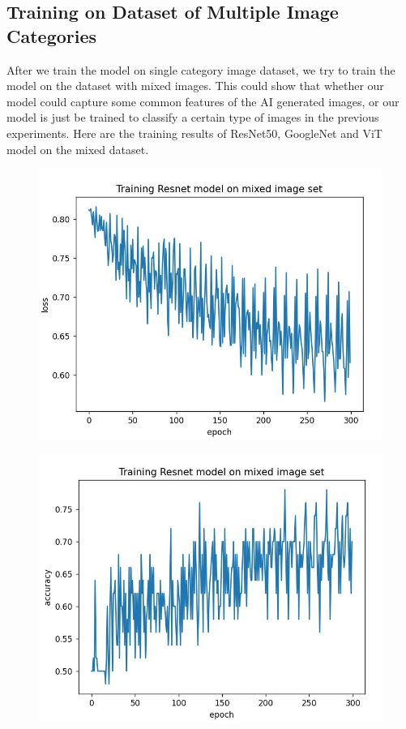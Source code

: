 \documentclass[conference]{IEEEtran}
\begin{document}
\subsection{Training on Dataset of Multiple Image Categories}

After we train the model on single category image dataset, we try to train the model on the dataset with mixed images. This could show that whether our model could capture some common features of the AI generated images, or our model is just be trained to classify a certain type of images in the previous
experiments. Here are the training results of ResNet50, GoogleNet and ViT model on the mixed dataset.

\begin{figure}[h]
  \centering
    \begin{minipage}{.24\textwidth}
      \centering
      \includegraphics[width=0.9\linewidth]{resnet_mixed_loss.jpg}
      \label{fig:test1}
    \end{minipage}%
    \begin{minipage}{.24\textwidth}
      \centering
      \includegraphics[width=0.9\linewidth]{resnet_mixed_accuracy.jpg}
      \label{fig:test2}
    \end{minipage}
\end{figure}
\end{document}
